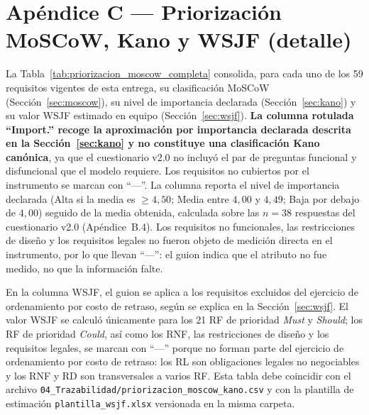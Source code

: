 \documentclass[journal,onecolumn]{IEEEtran}
\begin{document}
	\section*{Apéndice C --- Priorización MoSCoW, Kano y WSJF (detalle)}
	\label{ap:priorizacion}
	
	La Tabla~\ref{tab:priorizacion_moscow_completa} consolida, para cada uno de
	los 59 requisitos vigentes de esta entrega, su clasificación MoSCoW
	(Sección~\ref{sec:moscow}), su nivel de importancia declarada
	(Sección~\ref{sec:kano}) y su valor WSJF estimado en equipo
	(Sección~\ref{sec:wsjf}). \textbf{La columna rotulada \enquote{Import.}
		recoge la aproximación por importancia declarada descrita en la
		Sección~\ref{sec:kano} y no constituye una clasificación Kano canónica},
	ya que el cuestionario v2.0 no incluyó el par de preguntas funcional y
	disfuncional que el modelo requiere. Los requisitos no cubiertos por el
	instrumento se marcan con \enquote{---}. La columna reporta el nivel de
	importancia declarada (Alta si la media es $\geq 4{,}50$; Media entre
	$4{,}00$ y $4{,}49$; Baja por debajo de $4{,}00$) seguido de la media
	obtenida, calculada sobre las $n = 38$ respuestas del cuestionario v2.0
	(Apéndice~B.4). Los requisitos no funcionales, las restricciones de diseño y
	los requisitos legales no fueron objeto de medición directa en el
	instrumento, por lo que llevan \enquote{---}: el guion indica que el atributo
	no fue medido, no que la información falte.
	
	En la columna WSJF, el guion se aplica a los requisitos excluidos del
	ejercicio de ordenamiento por costo de retraso, según se explica en la
	Sección~\ref{sec:wsjf}. El valor WSJF se calculó únicamente para los 21 RF
	de prioridad \emph{Must} y \emph{Should}; los RF de prioridad \emph{Could},
	así como los RNF, las restricciones de diseño y los requisitos legales, se
	marcan con \enquote{---} porque no forman parte del ejercicio de ordenamiento
	por costo de retraso: los RL son obligaciones legales no negociables y los
	RNF y RD son transversales a varios RF. Esta tabla debe coincidir con el
	archivo \texttt{04\_Trazabilidad/priorizacion\_moscow\_kano.csv} y con la
	plantilla de estimación \texttt{plantilla\_wsjf.xlsx} versionada en la misma
	carpeta.
	
\end{document}
